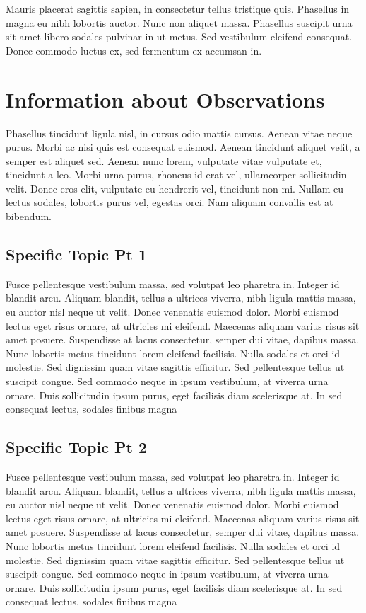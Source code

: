 \documentclass[linenumbers,RNAAS,trackchanges]{aastex631}
\begin{document}
Mauris placerat sagittis sapien, in consectetur tellus tristique quis. Phasellus in magna eu nibh lobortis auctor. Nunc non aliquet massa. Phasellus suscipit urna sit amet libero sodales pulvinar in ut metus. Sed vestibulum eleifend consequat. Donec commodo luctus ex, sed fermentum ex accumsan in.

\section{Information about Observations}
Phasellus tincidunt ligula nisl, in cursus odio mattis cursus. Aenean vitae neque purus. Morbi ac nisi quis est consequat euismod. Aenean tincidunt aliquet velit, a semper est aliquet sed. Aenean nunc lorem, vulputate vitae vulputate et, tincidunt a leo. Morbi urna purus, rhoncus id erat vel, ullamcorper sollicitudin velit. Donec eros elit, vulputate eu hendrerit vel, tincidunt non mi. Nullam eu lectus sodales, lobortis purus vel, egestas orci. Nam aliquam convallis est at bibendum.

\subsection{Specific Topic Pt 1} \label{sec:subtopic1}
Fusce pellentesque vestibulum massa, sed volutpat leo pharetra in. Integer id blandit arcu. Aliquam blandit, tellus a ultrices viverra, nibh ligula mattis massa, eu auctor nisl neque ut velit. Donec venenatis euismod dolor. Morbi euismod lectus eget risus ornare, at ultricies mi eleifend. Maecenas aliquam varius risus sit amet posuere. Suspendisse at lacus consectetur, semper dui vitae, dapibus massa. Nunc lobortis metus tincidunt lorem eleifend facilisis. Nulla sodales et orci id molestie. Sed dignissim quam vitae sagittis efficitur. Sed pellentesque tellus ut suscipit congue. Sed commodo neque in ipsum vestibulum, at viverra urna ornare. Duis sollicitudin ipsum purus, eget facilisis diam scelerisque at. In sed consequat lectus, sodales finibus magna


\subsection{Specific Topic Pt 2} \label{sec:subtopic2}
Fusce pellentesque vestibulum massa, sed volutpat leo pharetra in. Integer id blandit arcu. Aliquam blandit, tellus a ultrices viverra, nibh ligula mattis massa, eu auctor nisl neque ut velit. Donec venenatis euismod dolor. Morbi euismod lectus eget risus ornare, at ultricies mi eleifend. Maecenas aliquam varius risus sit amet posuere. Suspendisse at lacus consectetur, semper dui vitae, dapibus massa. Nunc lobortis metus tincidunt lorem eleifend facilisis. Nulla sodales et orci id molestie. Sed dignissim quam vitae sagittis efficitur. Sed pellentesque tellus ut suscipit congue. Sed commodo neque in ipsum vestibulum, at viverra urna ornare. Duis sollicitudin ipsum purus, eget facilisis diam scelerisque at. In sed consequat lectus, sodales finibus magna
\end{document}
